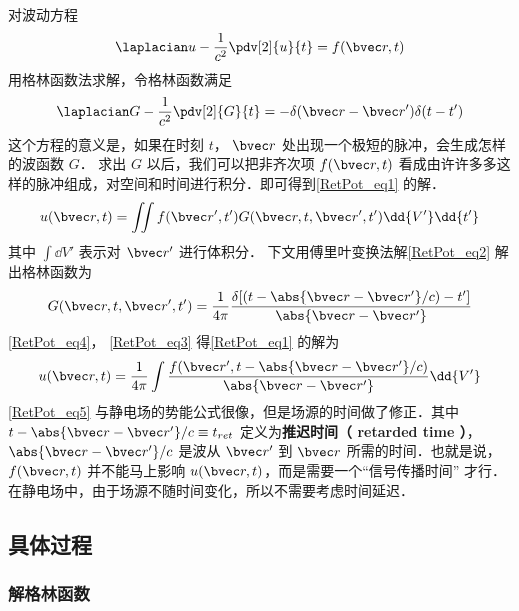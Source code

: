 
\begin{issues}
\issueDraft
\end{issues}


对波动方程
\begin{equation}\label{RetPot_eq1}
\laplacian u  - \frac{1}{c^2} \pdv[2]{u}{t} = f(\bvec r, t)
\end{equation} 
用格林函数法求解，令格林函数满足
\begin{equation}\label{RetPot_eq2}
\laplacian G - \frac{1}{c^2} \pdv[2]{G}{t} =  - \delta (\bvec r - \bvec r')\delta (t - t')
\end{equation} 
这个方程的意义是，如果在时刻 $t$， $\bvec r$ 处出现一个极短的脉冲，会生成怎样的波函数 $G$． 求出 $G$ 以后，我们可以把非齐次项 $f(\bvec r, t)$ 看成由许许多多这样的脉冲组成，对空间和时间进行积分．即可得到\autoref{RetPot_eq1} 的解．
\begin{equation}\label{RetPot_eq3}
u(\bvec r, t) = \iint f(\bvec r', t')G(\bvec r,t, \bvec r',t') \dd{V'} \dd{t'} 
\end{equation} 
其中 $\int \dd{V'}$ 表示对 $\bvec r'$ 进行体积分． 下文用傅里叶变换法解\autoref{RetPot_eq2} 解出格林函数为
\begin{equation}\label{RetPot_eq4}
G(\bvec r, t, \bvec r', t') = \frac{1}{4\pi} \frac{\delta [(t - \abs{\bvec r - \bvec r'}/c) - t']}{\abs{\bvec r - \bvec r'}}
\end{equation} 
\autoref{RetPot_eq4}， \autoref{RetPot_eq3} 得\autoref{RetPot_eq1} 的解为
\begin{equation}\label{RetPot_eq5}
u(\bvec r, t) = \frac{1}{4\pi } \int \frac{f(\bvec r',t - \abs{\bvec r - \bvec r'}/c)}{\abs{\bvec r - \bvec r'}} \dd{V'}
\end{equation} 
\autoref{RetPot_eq5} 与静电场的势能公式很像，但是场源的时间做了修正．其中 $t - \abs{\bvec r - \bvec r'}/c \equiv t_{ret}$ 定义为\textbf{推迟时间（ retarded time ）}， $\abs{\bvec r - \bvec r'}/c$ 是波从 $\bvec r'$ 到 $\bvec r$ 所需的时间．也就是说，$f(\bvec r, t)$ 并不能马上影响 $u(\bvec r, t)$，而是需要一个“信号传播时间” 才行．在静电场中，由于场源不随时间变化，所以不需要考虑时间延迟．

\subsection{具体过程}

\subsubsection{解格林函数}  

